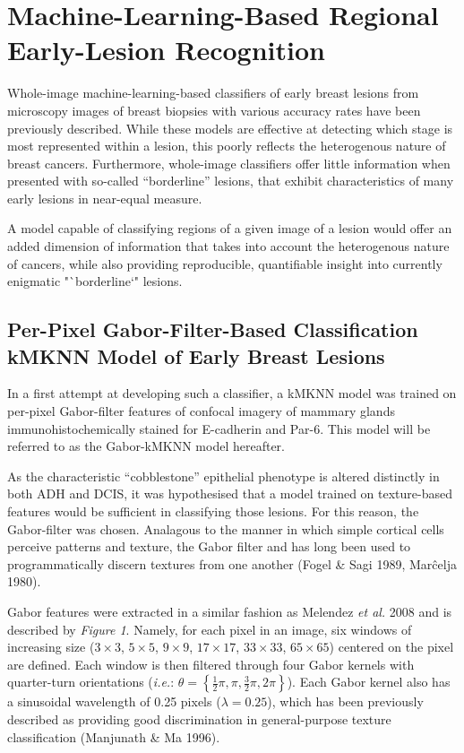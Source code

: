 \section{Machine-Learning-Based Regional Early-Lesion Recognition}

Whole-image machine-learning-based classifiers of early breast lesions
from microscopy images of breast biopsies with various accuracy rates have been
previously described. While these models are effective at detecting which stage
is most represented within a lesion, this poorly reflects the heterogenous nature
of breast cancers. Furthermore, whole-image classifiers offer little information
when presented with so-called ``borderline'' lesions, that exhibit
characteristics of many early lesions in near-equal measure.\par

A model capable of classifying regions of a given image of a lesion would
offer an added dimension of information that takes into account the heterogenous
nature of cancers, while also providing reproducible, quantifiable insight into
currently enigmatic "`borderline`" lesions.\par

\subsection{Per-Pixel Gabor-Filter-Based Classification kMKNN Model of Early Breast Lesions}
In a first attempt at developing such a classifier, a kMKNN model was trained on
per-pixel Gabor-filter features of confocal imagery of mammary glands
immunohistochemically stained for E-cadherin and Par-6. This model will be
referred to as the Gabor-kMKNN model hereafter.\par

As the characteristic ``cobblestone'' epithelial phenotype is altered distinctly
in both ADH and DCIS, it was hypothesised that a model trained on texture-based
features would be sufficient in classifying those lesions. For this reason, the
Gabor-filter was chosen. Analagous to the manner in which simple cortical cells
perceive patterns and texture, the Gabor filter and has long been used to
programmatically discern textures from one another
(Fogel \& Sagi 1989, Marĉelja 1980).\par

Gabor features were extracted in a similar fashion as Melendez \emph{et al.} 2008 and is described by \emph{Figure 1}. Namely, for each pixel in an image, six windows of increasing size ($3\times3$, $5\times5$, $9\times9$, $17\times17$, $33\times33$, $65\times65$) centered on the pixel are defined. Each window is then filtered through four Gabor kernels with quarter-turn orientations (\emph{i.e.}: $\theta = \left\{\frac{1}{2}\pi, \pi, \frac{3}{2}\pi, 2\pi \right\}$). Each Gabor kernel also has a sinusoidal wavelength of 0.25 pixels ($\lambda = 0.25$), which has been previously described as providing good discrimination in general-purpose texture classification
(Manjunath \& Ma 1996).\par


